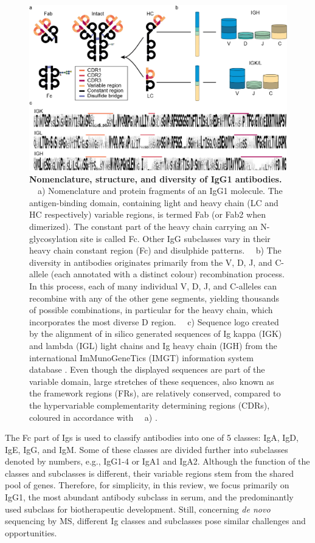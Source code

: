 \begin{figure}[!htb]
  \center
  \includegraphics[]{Chapter.1/Figures/f1.png}
  \caption{
    \textbf{Nomenclature, structure, and diversity of IgG1 antibodies.}
    ~~a) Nomenclature and protein fragments of an IgG1 molecule. The antigen-binding domain, containing light and heavy chain (LC and HC respectively) variable regions, is termed Fab (or Fab2 when dimerized). The constant part of the heavy chain carrying an N-glycosylation site is called Fc. Other IgG subclasses vary in their heavy chain constant region (Fc) and disulphide patterns. ~~b) The diversity in antibodies originates primarily from the V, D, J, and C-allele (each annotated with a distinct colour) recombination process. In this process, each of many individual V, D, J, and C-alleles can recombine with any of the other gene segments, yielding thousands of possible combinations, in particular for the heavy chain, which incorporates the most diverse D region. ~~c) Sequence logo created by the alignment of in silico generated sequences of Ig kappa (IGK) and lambda (IGL) light chains and Ig heavy chain (IGH) from the international ImMunoGeneTics (IMGT) information system database \cite{lefranc2003imgt}. Even though the displayed sequences are part of the variable domain, large stretches of these sequences, also known as the framework regions (FRs), are relatively conserved, compared to the hypervariable complementarity determining regions (CDRs), coloured in accordance with ~~a) .
  }
  \label{fig:fig1.1}
\end{figure}
The Fc part of Igs is used to classify antibodies into one of 5 classes: IgA, IgD, IgE, IgG, and IgM. Some of these classes are divided further into subclasses denoted by numbers, e.g., IgG1-4 or IgA1 and IgA2. Although the function of the classes and subclasses is different, their variable regions stem from the shared pool of genes. Therefore, for simplicity, in this review, we focus primarily on IgG1, the most abundant antibody subclass in serum, and the predominantly used subclass for biotherapeutic development. Still, concerning \emph{de novo} sequencing by MS, different Ig classes and subclasses pose similar challenges and opportunities.

